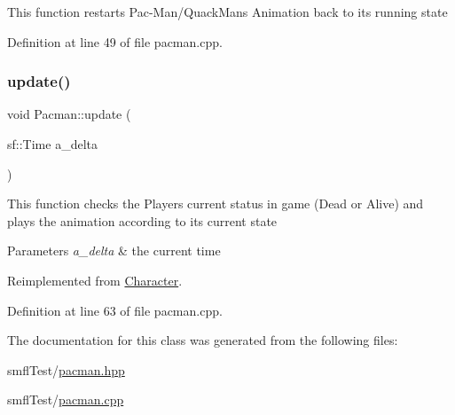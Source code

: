 This function restarts Pac-\/\+Man/\+Quack\+Man\textquotesingle{}s Animation back to it\textquotesingle{}s running state 

Definition at line 49 of file pacman.\+cpp.

\mbox{\label{class_pacman_a6badb47a28223991a1eb540f9d970e77}} 
\subsubsection{\texorpdfstring{update()}{update()}}
{\footnotesize\ttfamily void Pacman\+::update (\begin{DoxyParamCaption}\item[{sf\+::\+Time}]{a\+\_\+delta }\end{DoxyParamCaption})\hspace{0.3cm}{\ttfamily [virtual]}}

This function checks the Player\textquotesingle{}s current status in game (Dead or Alive) and plays the animation according to it\textquotesingle{}s current state


\begin{DoxyParams}{Parameters}
{\em a\+\_\+delta} & the current time \\
\hline
\end{DoxyParams}


Reimplemented from \hyperlink{class_character_a89b72b507971ba8648909980d045ed06}{Character}.



Definition at line 63 of file pacman.\+cpp.



The documentation for this class was generated from the following files\+:\begin{DoxyCompactItemize}
\item 
smfl\+Test/\hyperlink{pacman_8hpp}{pacman.\+hpp}\item 
smfl\+Test/\hyperlink{pacman_8cpp}{pacman.\+cpp}\end{DoxyCompactItemize}
